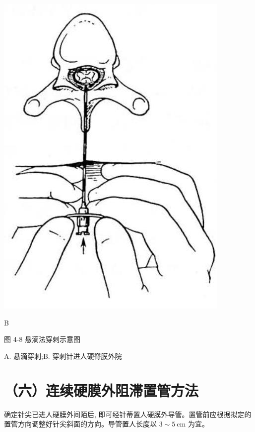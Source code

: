 \documentclass[10pt]{article}
\begin{document}
\begin{center}
\includegraphics[max width=\textwidth]{2024_07_09_002a177993bd97d1d6d7g-066(1)}
\end{center}

B

图 4-8 悬滴法穿刺示意图

A. 悬滴穿刺;B. 穿刺针进人硬脊膜外院

\section*{（六）连续硬膜外阻滞置管方法}
确定针尖已进人硬膜外间陌后, 即可经针蒂置人硬膜外导管。置管前应根据拟定的置管方向调整好针尖斜面的方向。导管置人长度以 $3 \sim 5 \mathrm{~cm}$ 为宜。
\end{document}
